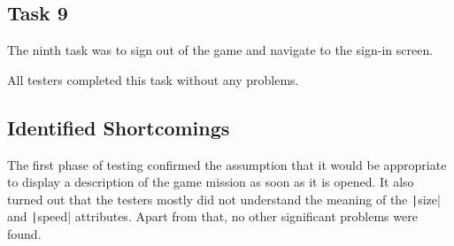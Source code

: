 \subsection*{Task 9}

The ninth task was to sign out of the game and navigate to the sign-in screen.

All testers completed this task without any problems.

\subsection*{Identified Shortcomings}

The first phase of testing confirmed the assumption that it would be appropriate to display a description of the game mission as soon as it is opened.
It also turned out that the testers mostly did not understand the meaning of the \texttt|size| and \texttt|speed| attributes.
Apart from that, no other significant problems were found.
